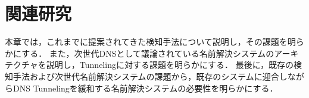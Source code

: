 \documentclass[12pt]{jarticle} %
\begin{document}



\newpage
\section{関連研究}
本章では，これまでに提案されてきた検知手法について説明し，その課題を明らかにする．
また，次世代DNSとして議論されている名前解決システムのアーキテクチャを説明し，Tunnelingに対する課題を明らかにする．
最後に，既存の検知手法および次世代名前解決システムの課題から，既存のシステムに迎合しながらDNS Tunnelingを緩和する名前解決システムの必要性を明らかにする．
\end{document}
